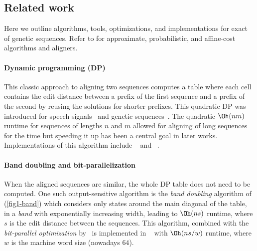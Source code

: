 \subsection{Related work} \label{sec:intro-related-work}

Here we outline algorithms, tools, optimizations, and implementations for exact
\pa of genetic sequences. Refer to \citet{kucherov2019evolution} for
approximate, probabilistic, and affine-cost algorithms and aligners.

\paragraph{Dynamic programming (DP)} This classic approach to aligning two
sequences computes a table where each cell contains the edit distance between a
prefix of the first sequence and a prefix of the second by reusing the solutions
for shorter prefixes. This quadratic DP was introduced for speech
signals~\citet{vintsyuk1968speech} and genetic
sequences~\citep{needleman1970general,sankoff1972matching,sellers1974theory,wagner1974string}.
The quadratic $\Oh(nm)$ runtime for sequences of lengths $n$ and $m$
allowed for aligning of long sequences for the time but speeding it up has been
a central goal in later works. Implementations of this algorithm include
\seqan~\citep{reinert2017seqan} and \parasail~\citep{daily2016parasail}.

\paragraph{Band doubling and bit-parallelization} When the aligned
sequences are similar, the whole DP table does not need to be computed.
One such output-sensitive algorithm is the \emph{band doubling}
algorithm of \citet{ukkonen1985algorithms} (\cref{fig1-band}) which considers
only states around the main diagonal of the table, in a \emph{band}
with exponentially increasing width, leading to $\Oh(ns)$ runtime, where $s$ is
the edit distance between the sequences. This algorithm, combined with the
\emph{bit-parallel optimization} by~\citet{myers1999fast} is implemented in
\edlib~\citep{vsovsic2017edlib} with $\Oh(ns/w)$ runtime, where
$w$ is the machine word size (nowadays $64$).

